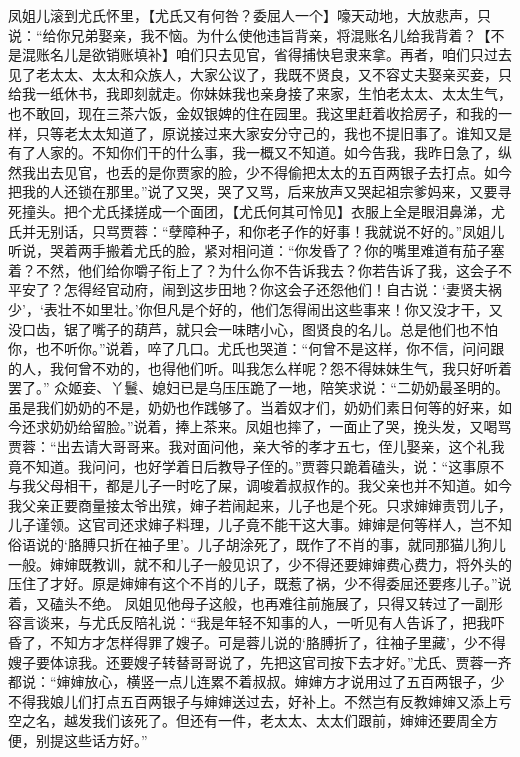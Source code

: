 \documentclass[12pt,oneside]{book}
\begin{document}
凤姐儿滚到尤氏怀里，【尤氏又有何咎？委屈人一个】嚎天动地，大放悲声，只说：“给你兄弟娶亲，我不恼。为什么使他违旨背亲，将混账名儿给我背着？【不是混账名儿是欲销账填补】咱们只去见官，省得捕快皂隶来拿。再者，咱们只过去见了老太太、太太和众族人，大家公议了，我既不贤良，又不容丈夫娶亲买妾，只给我一纸休书，我即刻就走。你妹妹我也亲身接了来家，生怕老太太、太太生气，也不敢回，现在三茶六饭，金奴银婢的住在园里。我这里赶着收拾房子，和我的一样，只等老太太知道了，原说接过来大家安分守己的，我也不提旧事了。谁知又是有了人家的。不知你们干的什么事，我一概又不知道。如今告我，我昨日急了，纵然我出去见官，也丢的是你贾家的脸，少不得偷把太太的五百两银子去打点。如今把我的人还锁在那里。”说了又哭，哭了又骂，后来放声又哭起祖宗爹妈来，又要寻死撞头。把个尤氏揉搓成一个面团，【尤氏何其可怜见】衣服上全是眼泪鼻涕，尤氏并无别话，只骂贾蓉：“孽障种子，和你老子作的好事！我就说不好的。”凤姐儿听说，哭着两手搬着尤氏的脸，紧对相问道：“你发昏了？你的嘴里难道有茄子塞着？不然，他们给你嚼子衔上了？为什么你不告诉我去？你若告诉了我，这会子不平安了？怎得经官动府，闹到这步田地？你这会子还怨他们！自古说：‘妻贤夫祸少’，‘表壮不如里壮。’你但凡是个好的，他们怎得闹出这些事来！你又没才干，又没口齿，锯了嘴子的葫芦，就只会一味瞎小心，图贤良的名儿。总是他们也不怕你，也不听你。”说着，啐了几口。尤氏也哭道：“何曾不是这样，你不信，问问跟的人，我何曾不劝的，也得他们听。叫我怎么样呢？怨不得妹妹生气，我只好听着罢了。”
众姬妾、丫鬟、媳妇已是乌压压跪了一地，陪笑求说：“二奶奶最圣明的。虽是我们奶奶的不是，奶奶也作践够了。当着奴才们，奶奶们素日何等的好来，如今还求奶奶给留脸。”说着，捧上茶来。凤姐也摔了，一面止了哭，挽头发，又喝骂贾蓉：“出去请大哥哥来。我对面问他，亲大爷的孝才五七，侄儿娶亲，这个礼我竟不知道。我问问，也好学着日后教导子侄的。”贾蓉只跪着磕头，说：“这事原不与我父母相干，都是儿子一时吃了屎，调唆着叔叔作的。我父亲也并不知道。如今我父亲正要商量接太爷出殡，婶子若闹起来，儿子也是个死。只求婶婶责罚儿子，儿子谨领。这官司还求婶子料理，儿子竟不能干这大事。婶婶是何等样人，岂不知俗语说的‘胳膊只折在袖子里’。儿子胡涂死了，既作了不肖的事，就同那猫儿狗儿一般。婶婶既教训，就不和儿子一般见识了，少不得还要婶婶费心费力，将外头的压住了才好。原是婶婶有这个不肖的儿子，既惹了祸，少不得委屈还要疼儿子。”说着，又磕头不绝。
凤姐见他母子这般，也再难往前施展了，只得又转过了一副形容言谈来，与尤氏反陪礼说：“我是年轻不知事的人，一听见有人告诉了，把我吓昏了，不知方才怎样得罪了嫂子。可是蓉儿说的‘胳膊折了，往袖子里藏’，少不得嫂子要体谅我。还要嫂子转替哥哥说了，先把这官司按下去才好。”尤氏、贾蓉一齐都说：“婶婶放心，横竖一点儿连累不着叔叔。婶婶方才说用过了五百两银子，少不得我娘儿们打点五百两银子与婶婶送过去，好补上。不然岂有反教婶婶又添上亏空之名，越发我们该死了。但还有一件，老太太、太太们跟前，婶婶还要周全方便，别提这些话方好。”
\end{document}

